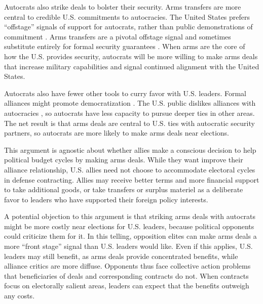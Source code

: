 \documentclass[12pt]{article}
\begin{document}
Autocrats also strike deals to bolster their security.
Arms transfers are more central to credible U.S. commitments to autocracies.  
The United States prefers ``offstage'' signals of support for autocrats, rather than public demonstrations of commitment \citep{McManusYarhi-Milo2017}.
Arms transfers are a pivotal offstage signal and sometimes substitute entirely for formal security guarantees \citep{Yarhi-Miloetal2016}. 
When arms are the core of how the U.S. provides security, autocrats will be more willing to make arms deals that increase military capabilities and signal continued alignment with the United States.


Autocrats also have fewer other tools to curry favor with U.S. leaders.
Formal alliances might promote democratization \citep{GiblerWolford2006, Warren2016}.
The U.S. public dislikes alliances with autocracies \citep{Alley2022}, so autocrats have less capacity to pursue deeper ties in other areas. 
The net result is that arms deals are central to U.S. ties with autocratic security partners, so autocrats are more likely to make arms deals near elections. 


This argument is agnostic about whether allies make a conscious decision to help political budget cycles by making arms deals.
While they want improve their alliance relationship, U.S. allies need not choose to accommodate electoral cycles in defense contracting.
Allies may receive better terms and more financial support to take additional goods, or take transfers or surplus materiel as a deliberate favor to leaders who have supported their foreign policy interests. 


A potential objection to this argument is that striking arms deals with autocrats might be more costly near elections for U.S. leaders, because political opponents could criticize them for it. 
In this telling, opposition elites can make arms deals a more ``front stage'' signal than U.S. leaders would like. 
Even if this applies, U.S. leaders may still benefit, as arms deals provide concentrated benefits, while alliance critics are more diffuse. 
Opponents thus face collective action problems that beneficiaries of deals and corresponding contracts do not. 
When contracts focus on electorally salient areas, leaders can expect that the benefits outweigh any costs. 
\end{document}
